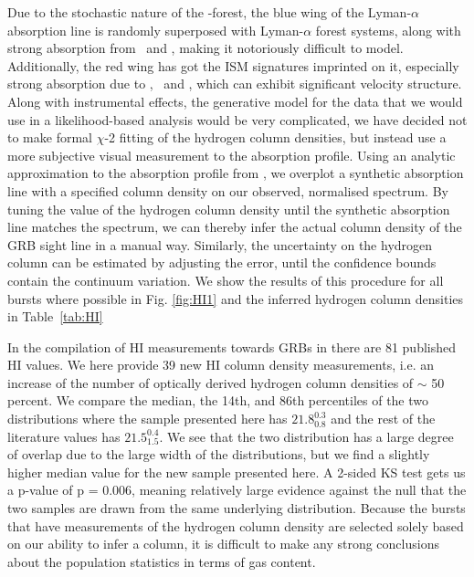 \documentclass{aa}    %
\begin{document}
Due to the stochastic nature of the \lya-forest, the blue wing of the
Lyman-$\alpha$ absorption line is randomly superposed with Lyman-$\alpha$ forest
systems, along with strong absorption from \mnii~and \SIiii, making it
notoriously difficult to model. Additionally, the red wing has got the ISM
signatures imprinted on it, especially strong absorption due to \SIii, \sii~and
\nv, which can exhibit significant velocity structure. Along with instrumental
effects, the generative model for the data that we would use in a
likelihood-based analysis would be very complicated, we have decided not to make
formal $\chi$-2 fitting of the hydrogen column densities, but instead use a more
subjective visual measurement to the absorption profile.  Using an analytic
approximation to the absorption profile from \citep{TepperGarcia2006}, we
overplot a synthetic absorption line with a specified column density on our
observed, normalised spectrum. By tuning the value of the hydrogen column
density until the synthetic absorption line matches the spectrum, we can thereby
infer the actual column density of the GRB sight line in a manual way.
Similarly, the uncertainty on the hydrogen column can be estimated by adjusting
the error, until the confidence bounds contain the continuum variation. We show
the results of this procedure for all bursts where possible in Fig.
\ref{fig:HI1} and the inferred hydrogen column densities in Table~\ref{tab:HI}



In the compilation of HI measurements towards GRBs in \citet{Tanvir2017} there
are 81 published HI values. We here provide 39 new HI column density
measurements, i.e. an increase of the number of optically derived hydrogen
column densities of $\sim$ 50 percent. We compare the median, the 14th, and 86th
percentiles of the two distributions where the sample presented here has
$21.8_{0.8}^{0.3}$ and the rest of the literature values has
$21.5_{1.5}^{0.4}$. We see that the two distribution has a large degree of
overlap due to the large width of the distributions, but we find a slightly
higher median value for the new sample presented here. A 2-sided KS test gets us
a p-value of p = 0.006, meaning relatively large evidence against the null that
the two samples are drawn from the same underlying distribution. Because the
bursts that have measurements of the hydrogen column density are selected solely
based on our ability to infer a column, it is difficult to make any strong
conclusions about the population statistics in terms of gas content. 
\end{document}

